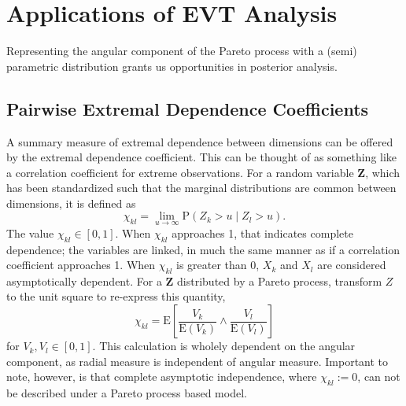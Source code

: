 \section{Applications of EVT Analysis}
Representing the angular component of the Pareto process with a (semi) parametric distribution grants
  us opportunities in posterior analysis.
%

\subsection{Pairwise Extremal Dependence Coefficients}
A summary measure of extremal dependence between dimensions can be offered by the extremal dependence
  coefficient.  This can be thought of as something like a correlation coefficient for extreme
  observations.  For a random variable $\bm{Z}$, which has been standardized such that the marginal
  distributions are common between dimensions, it is defined as
  \begin{equation}
    \chi_{kl} = \lim\limits_{u\to\infty}\text{P}\left(Z_k > u\mid Z_l > u\right).
  \end{equation}
  The value $\chi_{kl} \in [0,1]$.  When $\chi_{kl}$ approaches 1, that indicates complete dependence;
  the variables are linked, in much the same manner as if a correlation coefficient approaches 1.
  When $\chi_{kl}$ is greater than 0, $X_k$ and $X_l$ are considered asymptotically dependent.  For
  a $\bm{Z}$ distributed by a Pareto process, \cite{warner2018} transform $Z$ to the unit square to
  re-express this quantity,
  \begin{equation}
    \label{eqn:extdepcoef}
    \chi_{kl} = \text{E}\left[\frac{V_k}{\text{E}(V_k)}\wedge\frac{V_l}{\text{E}(V_l)}\right]
  \end{equation}
  for $V_k,V_l \in [0,1]$.  This calculation is wholely dependent on the angular component, as radial
  measure is independent of angular measure.  Important to note, however, is that complete asymptotic
  independence, where $\chi_{kl} := 0$, can not be described under a Pareto process based model.

